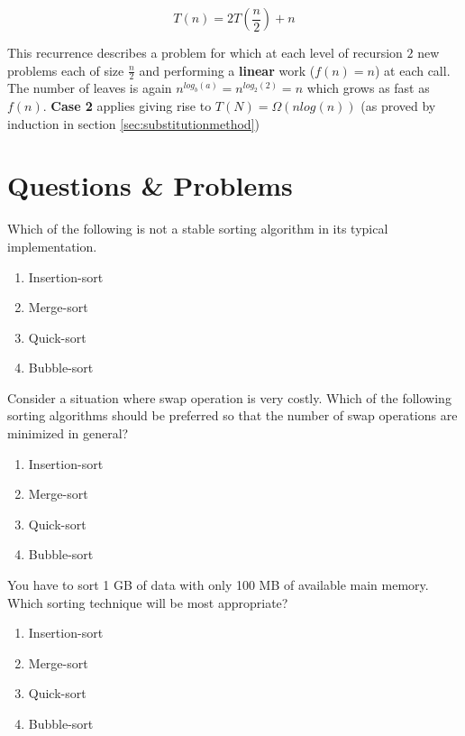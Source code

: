 \begin{example}

\[T(n) = 2T(\frac{n}{2}) + n\]

This recurrence describes a problem for which at each level of recursion $2$ new problems each of size $\frac{n}{2}$ and performing a \textbf{linear} work ($f(n) =n$) at each call.
The number of leaves is again $n^{log_b(a)} = n^{log_2(2)} = n $ which grows as fast as $f(n)$. \textbf{Case 2} applies giving rise to $T(N) = \Omega(n log(n))$ (as proved by induction in section \ref{sec:substitutionmethod})

\end{example}



\section{Questions \& Problems}
\begin{problem}
Which of the following is not a stable sorting algorithm in its typical implementation.
\begin{enumerate}
\item Insertion-sort
\item Merge-sort
\item Quick-sort
\item Bubble-sort
\end{enumerate}

\end{problem}

\begin{problem}
Consider a situation where swap operation is very costly. Which of the following sorting algorithms should be preferred so that the number of swap operations are minimized in general?
\begin{enumerate}
\item Insertion-sort
\item Merge-sort
\item Quick-sort
\item Bubble-sort
\end{enumerate}

\end{problem}



\begin{problem}
You have to sort 1 GB of data with only 100 MB of available main memory. Which sorting technique will be most appropriate?
\begin{enumerate}
\item Insertion-sort
\item Merge-sort
\item Quick-sort
\item Bubble-sort
\end{enumerate}

\end{problem}


